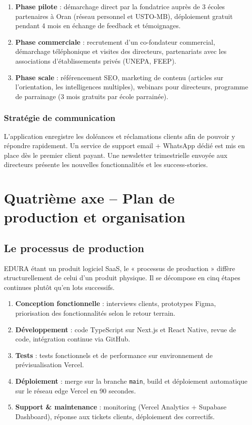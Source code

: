 \documentclass[12pt,a4paper,oneside]{report}
\begin{document}
\begin{enumerate}
  \item \textbf{Phase pilote} : démarchage direct par la fondatrice auprès de 3 écoles partenaires à Oran (réseau personnel et USTO-MB), déploiement gratuit pendant 4 mois en échange de feedback et témoignages.
  \item \textbf{Phase commerciale} : recrutement d'un co-fondateur commercial, démarchage téléphonique et visites des directeurs, partenariats avec les associations d'établissements privés (UNEPA, FEEP).
  \item \textbf{Phase scale} : référencement SEO, marketing de contenu (articles sur l'orientation, les intelligences multiples), webinars pour directeurs, programme de parrainage (3 mois gratuits par école parrainée).
\end{enumerate}

\subsubsection{Stratégie de communication}

L'application enregistre les doléances et réclamations clients afin de pouvoir y répondre rapidement. Un service de support email + WhatsApp dédié est mis en place dès le premier client payant. Une newsletter trimestrielle envoyée aux directeurs présente les nouvelles fonctionnalités et les success-stories.

\section{Quatrième axe -- Plan de production et organisation}

\subsection{Le processus de production}

EDURA étant un produit logiciel SaaS, le « processus de production » diffère structurellement de celui d'un produit physique. Il se décompose en cinq étapes continues plutôt qu'en lots successifs.

\begin{enumerate}
  \item \textbf{Conception fonctionnelle} : interviews clients, prototypes Figma, priorisation des fonctionnalités selon le retour terrain.
  \item \textbf{Développement} : code TypeScript sur Next.js et React Native, revue de code, intégration continue via GitHub.
  \item \textbf{Tests} : tests fonctionnels et de performance sur environnement de prévisualisation Vercel.
  \item \textbf{Déploiement} : merge sur la branche \texttt{main}, build et déploiement automatique sur le réseau edge Vercel en 90 secondes.
  \item \textbf{Support \& maintenance} : monitoring (Vercel Analytics + Supabase Dashboard), réponse aux tickets clients, déploiement des correctifs.
\end{enumerate}
\end{document}

